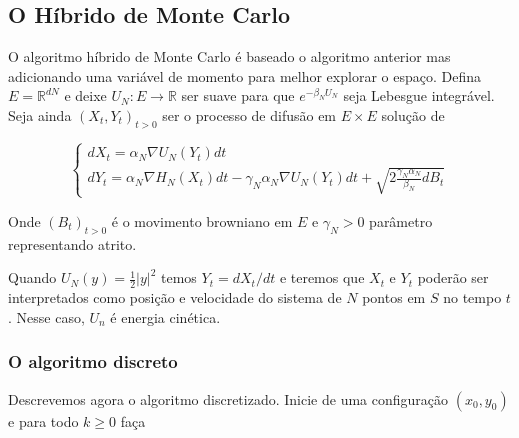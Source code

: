 \subsection{O Híbrido de Monte Carlo}

O algoritmo híbrido de Monte Carlo é baseado o algoritmo anterior mas adicionando uma variável de momento para melhor explorar o espaço. Defina $E = \mathbb{R}^{dN}$ e deixe $U_N : E \rightarrow \mathbb{R}$ ser suave para que $e^{-\beta_N U_N}$ seja Lebesgue integrável. Seja ainda $(X_t, Y_t)_{t>0}$ ser o processo de difusão em $E \times E$ solução de

\[
\begin{cases}
	dX_t = \alpha_N \nabla U_N (Y_t) dt \\
	dY_t = \alpha_N \nabla H_N(X_t) dt - \gamma_N \alpha_N \nabla U_N(Y_t) dt + \sqrt{2\frac{\gamma_N \alpha_N}{\beta_N} dB_t}
\end{cases}
\]

Onde $(B_t)_{t>0}$ é o movimento browniano em $E$ e $\gamma_N > 0$ parâmetro representando atrito.

Quando $U_N(y) = \frac{1}{2}|y|^2$ temos $Y_t = dX_t/dt$ e teremos que $X_t$ e $Y_t$ poderão ser interpretados como posição e velocidade do sistema de $N$ pontos em $S$ no tempo $t$. Nesse caso, $U_n$ é energia cinética.

\subsubsection{O algoritmo discreto}

Descrevemos agora o algoritmo discretizado. Inicie de uma configuração $(x_0, y_0)$ e para todo $k \geq 0$ faça

